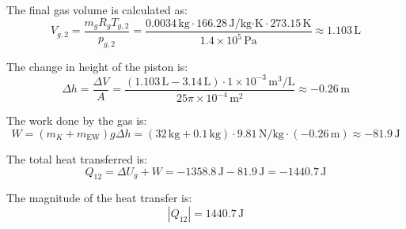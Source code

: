 The final gas volume is calculated as:  
\[
V_{g,2} = \frac{m_g R_g T_{g,2}}{p_{g,2}} = \frac{0.0034 \, \text{kg} \cdot 166.28 \, \text{J/kg·K} \cdot 273.15 \, \text{K}}{1.4 \times 10^5 \, \text{Pa}} \approx 1.103 \, \text{L}
\]  

The change in height of the piston is:  
\[
\Delta h = \frac{\Delta V}{A} = \frac{(1.103 \, \text{L} - 3.14 \, \text{L}) \cdot 1 \times 10^{-3} \, \text{m}^3/\text{L}}{25 \pi \times 10^{-4} \, \text{m}^2} \approx -0.26 \, \text{m}
\]  

The work done by the gas is:  
\[
W = (m_K + m_{\text{EW}}) g \Delta h = (32 \, \text{kg} + 0.1 \, \text{kg}) \cdot 9.81 \, \text{N/kg} \cdot (-0.26 \, \text{m}) \approx -81.9 \, \text{J}
\]  

The total heat transferred is:  
\[
Q_{12} = \Delta U_g + W = -1358.8 \, \text{J} - 81.9 \, \text{J} = -1440.7 \, \text{J}
\]  

The magnitude of the heat transfer is:  
\[
|Q_{12}| = 1440.7 \, \text{J}
\]  